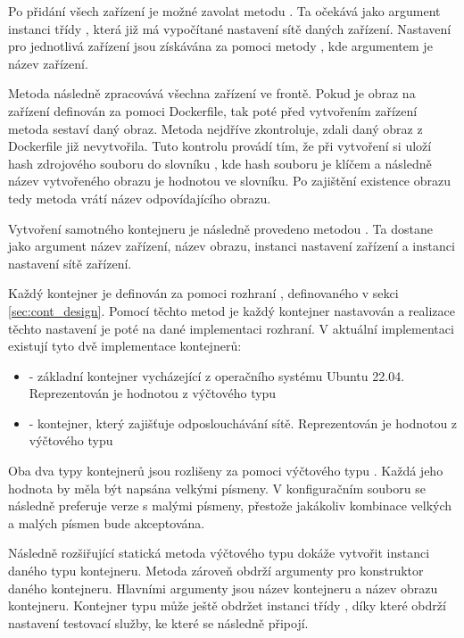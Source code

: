 Po přidání všech zařízení je možné zavolat metodu . Ta očekává jako argument instanci třídy , která již má vypočítané nastavení sítě daných zařízení. Nastavení pro jednotlivá zařízení jsou získávána za pomoci metody , kde argumentem je název zařízení. 

Metoda  následně zpracovává všechna zařízení ve frontě. Pokud je obraz na zařízení definován za pomoci Dockerfile, tak poté před vytvořením zařízení metoda  sestaví daný obraz. Metoda nejdříve zkontroluje, zdali daný obraz z Dockerfile již nevytvořila. Tuto kontrolu provádí tím, že při vytvoření si uloží hash zdrojového souboru do slovníku , kde hash souboru je klíčem a následně název vytvořeného obrazu je hodnotou ve slovníku. Po zajištění existence obrazu tedy metoda  vrátí název odpovídajícího obrazu. 

Vytvoření samotného kontejneru je následně provedeno metodou . Ta dostane jako argument název zařízení, název obrazu, instanci nastavení zařízení a instanci nastavení sítě zařízení. 

Každý kontejner je definován za pomoci rozhraní , definovaného v sekci \ref{sec:cont_design}. Pomocí těchto metod je každý kontejner nastavován a realizace těchto nastavení je poté na dané implementaci rozhraní. V aktuální implementaci existují tyto dvě implementace kontejnerů: 

\begin{itemize}
    \item {} - základní kontejner vycházející z operačního systému Ubuntu 22.04. Reprezentován je hodnotou z výčtového typu  
    \item {} - kontejner, který zajišťuje odposlouchávání sítě. Reprezentován je hodnotou z výčtového typu 
\end{itemize}

Oba dva typy kontejnerů jsou rozlišeny za pomoci výčtového typu . Každá jeho hodnota by měla být napsána velkými písmeny. V konfiguračním souboru se následně preferuje verze s malými písmeny, přestože jakákoliv kombinace velkých a malých písmen bude akceptována. 

Následně rozšiřující statická metoda výčtového typu  dokáže vytvořit instanci daného typu kontejneru. Metoda zároveň obdrží argumenty pro konstruktor daného kontejneru. Hlavními argumenty jsou název kontejneru a název obrazu kontejneru. Kontejner typu  může ještě obdržet instanci třídy , díky které obdrží nastavení testovací služby, ke které se následně připojí. 

